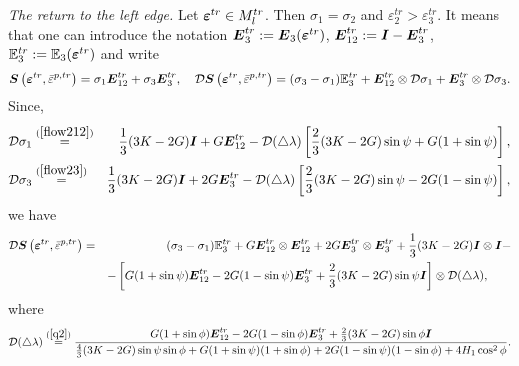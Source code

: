 \documentclass[a4paper,12pt]{article}
\theoremstyle{remark}
\newcommand{\mbf}[1]{\mbox{\boldmath$#1$}}
\numberwithin{equation}{section}
\begin{document}
\bigskip\noindent
{\it The return to the left edge.} Let $\mbf{\varepsilon}^{tr}\in M^{tr}_{l}$. Then $\sigma_1=\sigma_2$ and $\varepsilon_2^{tr}>\varepsilon_3^{tr}$. It means that one can introduce the notation $\mbf E_3^{tr}:=\mbf E_3(\mbf\varepsilon^{tr})$, $\mbf E_{12}^{tr}:=\mbf I-\mbf E_3^{tr}$, $\mathbb E_3^{tr}:=\mathbb E_3(\mbf\varepsilon^{tr})$ and write 
\begin{equation}
\mbf S\left(\mbf{\varepsilon}^{tr},\bar{\varepsilon}^{p,tr}\right)=\sigma_1\mbf E_{12}^{tr}+\sigma_3\mbf E_3^{tr},\quad \mathcal D\mbf S\left(\mbf{\varepsilon}^{tr},\bar{\varepsilon}^{p,tr}\right)=(\sigma_3-\sigma_1)\mathbb E_3^{tr}+\mbf E_{12}^{tr}\otimes\mathcal D\sigma_1+\mbf E_{3}^{tr}\otimes\mathcal D\sigma_3.
\label{sigmaE2}
\end{equation}
Since,
\begin{eqnarray*}
\mathcal D\sigma_1&\stackrel{(\ref{flow212})}{=}&\frac{1}{3}(3K-2G)\mbf I+G\mbf E_{12}^{tr}-\mathcal D(\triangle\lambda)\left[\frac{2}{3}(3K-2G)\sin\psi+G(1+\sin\psi)\right],\\
\mathcal D\sigma_3&\stackrel{(\ref{flow23})}{=}&\frac{1}{3}(3K-2G)\mbf I+2G\mbf E_3^{tr}-\mathcal D(\triangle\lambda)\left[\frac{2}{3}(3K-2G)\sin\psi-2G(1-\sin\psi)\right],
\end{eqnarray*}
we have
\begin{eqnarray}
\mathcal D\mbf S\left(\mbf{\varepsilon}^{tr},\bar{\varepsilon}^{p,tr}\right)&=&(\sigma_3-\sigma_1)\mathbb E_3^{tr}+G\mbf E_{12}^{tr}\otimes\mbf E_{12}^{tr}+2G\mbf E_3^{tr}\otimes\mbf E_3^{tr}+\frac{1}{3}(3K-2G)\mbf I\otimes\mbf I-\nonumber\\
&&-\left[G(1+\sin\psi)\mbf E_{12}^{tr}-2G(1-\sin\psi)\mbf E_3^{tr}+\frac{2}{3}(3K-2G)\sin\psi\mbf I\right]\otimes\mathcal D(\triangle\lambda),\qquad
\end{eqnarray}
where 
\begin{equation*}
\mathcal D(\triangle\lambda)\stackrel{(\ref{q2})}{=}\frac{G(1+\sin\phi)\mbf E_{12}^{tr}-2G(1-\sin\phi)\mbf E_3^{tr}+\frac{2}{3}(3K-2G)\sin\phi\mbf I}{\frac{4}{3}(3K-2G)\sin\psi\sin\phi+G(1+\sin\psi)(1+\sin\phi)+2G(1-\sin\psi)(1-\sin\phi)+4H_1\cos^2\phi}.
\end{equation*}
\end{document}
